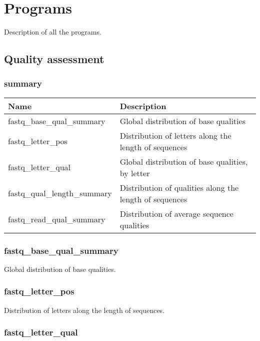 \documentclass[a4paper,12pt]{article}
\begin{document}
\section{Programs}

Description of all the programs.

\subsection{Quality assessment}

\subsubsection{summary}


\begin{tabularx}{\textwidth}{|X|X|}
    \hline
    \textbf{Name}                   & \textbf{Description} \\
    \hline
    \hline
    fastq\_base\_qual\_summary      & Global distribution of base qualities \\
    fastq\_letter\_pos              & Distribution of letters along the length of sequences \\
    fastq\_letter\_qual             & Global distribution of base qualities, by letter \\
    fastq\_qual\_length\_summary    & Distribution of qualities along the length of sequences \\
    fastq\_read\_qual\_summary      & Distribution of average sequence qualities \\
    \hline
\end{tabularx}

\subsubsection{fastq\_base\_qual\_summary}

Global distribution of base qualities.

\subsubsection{fastq\_letter\_pos}

Distribution of letters along the length of sequences.

\subsubsection{fastq\_letter\_qual}
\end{document}
